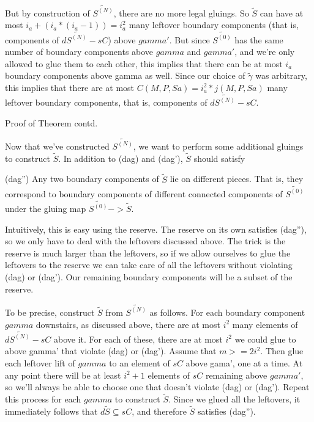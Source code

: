 \documentclass[12pt]{amsart}
\theoremstyle{definition}
\theoremstyle{remark}
\newcommand{\cin}{\subseteq}
\begin{document}
But by construction of $\widetilde{S^{(N)}}$, there are no more legal gluings. So
$\widetilde{S}$ can have at most $i_a+(i_a*(i_a-1)) = i_a^2$ many leftover boundary
components (that is, components of $d\widetilde{S^{(N)}}-sC$) above $gamma'$.  But since
$\widetilde{S^{(0)}}$ has the same number of boundary components above $gamma$ and
$gamma'$, and we're only allowed to glue them to each other, this implies that
there can be at most $i_a$ boundary components above gamma as well.  Since our
choice of $\widetilde{\gamma}$ was arbitrary, this implies that there are at most
$C(M,P,Sa) = i_a^2*j(M,P,Sa)$ many leftover boundary components, that is,
components of $d\widetilde{S^{(N)}}-sC$.

Proof of Theorem contd.

Now that we've constructed $\widetilde{S^{(N)}}$, we want to perform some additional
gluings to construct $\widetilde{S}$. In addition to (dag) and (dag'), $\widetilde{S}$ should
satisfy

(dag'') Any two boundary components of $\widetilde{S}$ lie on different pieces. That
is, they correspond to boundary components of different connected components of
$\widetilde{S^{(0)}}$ under the gluing map $\widetilde{S^{(0)}} -> \widetilde{S}$.

Intuitively, this is easy using the reserve. The reserve on its own satisfies
(dag''), so we only have to deal with the leftovers discussed above.  The trick
is the reserve is much larger than the leftovers, so if we allow ourselves to
glue the leftovers to the reserve we can take care of all the leftovers without
violating (dag) or (dag'). Our remaining boundary components will be a subset
of the reserve.

To be precise, construct $\widetilde{S}$ from $\widetilde{S^{(N)}}$ as follows.
For each boundary component $gamma$ downstairs, as discussed above, there are
at most $i^2$ many elements of $d\widetilde{S^{(N)}}-sC$ above it. For each of
these, there are at most $i^2$ we could glue to above gamma' that violate (dag)
or (dag').  Assume that $m>=2i^2$.  Then glue each leftover lift of $gamma$ to
an element of $sC$ above gama', one at a time. At any point there will be at
least $i^2+1$ elements of $sC$ remaining above $gamma'$, so we'll always be
able to choose one that doesn't violate (dag) or (dag'). Repeat this process
for each $gamma$ to construct $\widetilde{S}$.  Since we glued all the leftovers, it
immediately follows that $d\widetilde{S} \cin sC$, and therefore $\widetilde{S}$
satisfies (dag'').
\end{document}
